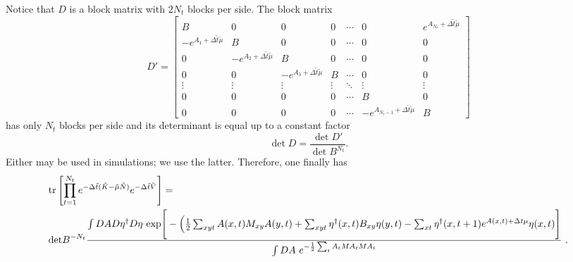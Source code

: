 Notice that $D$ is a block matrix with $2N_t$ blocks per side.
The block matrix
\begin{equation}
	D'
	=
	\begin{bmatrix}
		B                                      & 0                                      & 0                                      & 0      & \cdots & 0                                            & e^{A_{N_t}+ \Delta \tilde{t} \tilde{\mu}}
	\\	-e^{A_1+ \Delta \tilde{t} \tilde{\mu}} & B                                      & 0                                      & 0      & \cdots & 0                                            & 0
	\\	0                                      & -e^{A_2+ \Delta \tilde{t} \tilde{\mu}} & B                                      & 0      & \cdots & 0                                            & 0
	\\	0                                      & 0                                      & -e^{A_3+ \Delta \tilde{t} \tilde{\mu}} & B      & \cdots & 0                                            & 0
	\\	\vdots                                 & \vdots                                 & \vdots                                 & \vdots & \ddots & \vdots                                       & \vdots
	\\	0                                      & 0                                      & 0                                      & 0      & \cdots & B                                            & 0
	\\	0                                      & 0                                      & 0                                      & 0      & \cdots & -e^{A_{N_t-1}+ \Delta \tilde{t} \tilde{\mu}} & B
	\end{bmatrix}
\end{equation} 
has only $N_t$ blocks per side and its determinant is equal up to a constant factor
\begin{equation}
	\det D = \frac{ \det D' }{ \det B^{N_t} }.
\end{equation}
Either may be used in simulations; we use the latter.
Therefore, one finally has
\begin{align}
	& \text{tr}\left[\prod_{t=1}^{N_t} e^{-\Delta \tilde{t}(\tilde{K} - \tilde{\mu} \tilde{N})}  e^{-\Delta \tilde{t} \tilde{V}}  \right] = \\
& {\text{det} B}^{-N_t} \frac{  
\int DA D\eta^{\dagger} D \eta ~ \text{exp}\Bigg[-\Big( \frac{1}{2} \sum_{x y t} A(x,t) M_{xy} A(y,t) + \sum_{x y t}\eta^{\dagger}(x,t) B_{x y} \eta(y,t) - \sum_{x t}\eta^{\dagger}(x,t+1) e^{A(x,t) + \Delta t \mu} \eta(x,t) \Bigg] 
}{ 
\int DA ~ e^{-\frac{1}{2} \sum_t {A}_t M {A}_t M A_t}  
}~.
\end{align}
